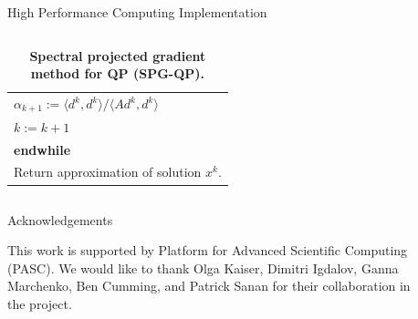 \documentclass[final,hyperref={pdfpagelabels=false}]{beamer}
\begin{document}
\begin{frame}[t]
\begin{columns}[t]
\begin{column}{.48\textwidth}
\begin{block}{High Performance Computing Implementation}
\begin{columns}[T]
\begin{column}{0.54\linewidth}
\begin{center}
\begin{table}[h!]
{\begin{tabular}{p{1.0\linewidth}}
	\hspace*{1.7CM} $\alpha_{k+1} := \langle d^k, d^k \rangle / \langle Ad^k, d^k \rangle$ \medskip\\
	\hspace*{1.7CM} $k := k + 1$ \\
	\hspace*{1.2CM} {\textbf{endwhile}} \\
	\smallskip
	Return approximation of solution $x^k$.
	\end{tabular}
	}
	\caption{\label{alg:spg_qp} \bf Spectral projected gradient method for QP (SPG-QP).}
	\end{table}
	\end{center}
\end{column}	
\begin{column}{0.02\linewidth}\end{column}
\end{columns}

\end{block}



\begin{block}{Acknowledgements}

\noindent
\par 

This work is supported by Platform for Advanced Scientific Computing (PASC).
We would like to thank Olga Kaiser, Dimitri Igdalov, Ganna Marchenko, Ben Cumming, and Patrick Sanan for their collaboration in the project.

\end{block}


\end{column} %


\begin{column}{.02\textwidth}\end{column} %

 
\begin{column}{.48\textwidth} %



\end{column}
\end{columns}
\end{frame}
\end{document}
